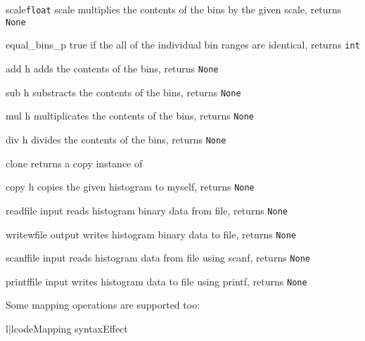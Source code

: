 \begin{methoddesc}{scale}{\texttt{float} scale}
multiplies the contents of the bins by the given scale, \hfill returns \texttt{None}
\end{methoddesc}
\begin{methoddesc}{equal_bins_p}{}
true if the all of the individual bin ranges are identical, \hfill returns \texttt{int}
\end{methoddesc}
\begin{methoddesc}{add}{ h}
adds the contents of the bins, \hfill returns \texttt{None}
\end{methoddesc}
\begin{methoddesc}{sub}{ h}
substracts the contents of the bins, \hfill returns \texttt{None}
\end{methoddesc}
\begin{methoddesc}{mul}{ h}
multiplicates the contents of the bins, \hfill returns \texttt{None}
\end{methoddesc}
\begin{methoddesc}{div}{ h}
divides the contents of the bins, \hfill returns \texttt{None}
\end{methoddesc}
\begin{methoddesc}{clone}{}
returns a copy instance of \hfill{}
\end{methoddesc}
\begin{methoddesc}{copy}{ h}
copies the given histogram to myself, \hfill returns \texttt{None}
\end{methoddesc}
\begin{methoddesc}{read}{file input}
reads histogram binary data from file, \hfill returns \texttt{None}
\end{methoddesc}
\begin{methoddesc}{writew}{file output}
writes histogram binary data to file, \hfill returns \texttt{None}
\end{methoddesc}
\begin{methoddesc}{scanf}{file input}
reads histogram data from file using scanf, \hfill returns \texttt{None}
\end{methoddesc}
\begin{methoddesc}{printf}{file input}
writes histogram data to file using printf, \hfill returns \texttt{None}
\end{methoddesc}

Some mapping operations are supported too:\nopagebreak
\begin{tableii}{l|l}{code}{Mapping syntax}{Effect}
\end{tableii}


